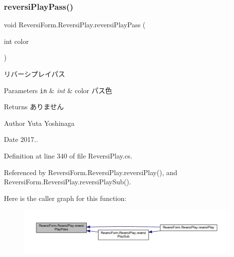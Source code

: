 \subsubsection{\texorpdfstring{reversi\+Play\+Pass()}{reversiPlayPass()}}
{\footnotesize\ttfamily void Reversi\+Form.\+Reversi\+Play.\+reversi\+Play\+Pass (\begin{DoxyParamCaption}\item[{int}]{color }\end{DoxyParamCaption})}



リバーシプレイパス 


\begin{DoxyParams}[1]{Parameters}
\mbox{\tt in}  & {\em int} & color パス色 \\
\hline
\end{DoxyParams}
\begin{DoxyReturn}{Returns}
ありません 
\end{DoxyReturn}
\begin{DoxyAuthor}{Author}
Yuta Yoshinaga 
\end{DoxyAuthor}
\begin{DoxyDate}{Date}
2017.. 
\end{DoxyDate}


Definition at line 340 of file Reversi\+Play.\+cs.



Referenced by Reversi\+Form.\+Reversi\+Play.\+reversi\+Play(), and Reversi\+Form.\+Reversi\+Play.\+reversi\+Play\+Sub().

Here is the caller graph for this function\+:
\nopagebreak
\begin{figure}[H]
\begin{center}
\leavevmode
\includegraphics[width=350pt]{class_reversi_form_1_1_reversi_play_adcbe040514044b7cc8498c0764638356_icgraph}
\end{center}
\end{figure}
\mbox{\label{class_reversi_form_1_1_reversi_play_a4fe42268a8d957c555db025f8b35d34e}} 
